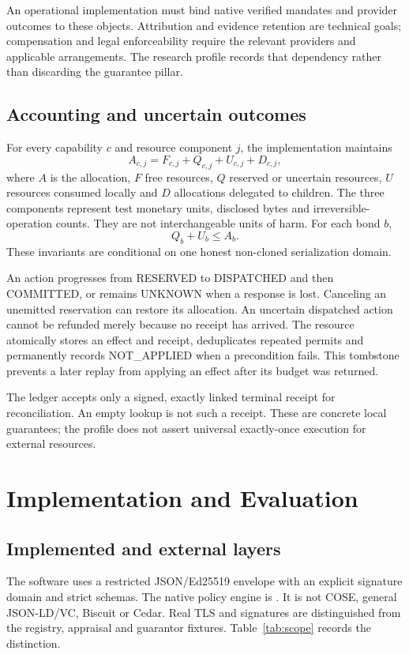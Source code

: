 \documentclass[journal,10pt]{IEEEtran}
\newcommand{\code}[1]{\texttt{\detokenize{#1}}}
\begin{document}
An operational implementation must bind native verified mandates and provider outcomes to these objects. Attribution and evidence retention are technical goals; compensation and legal enforceability require the relevant providers and applicable arrangements. The research profile records that dependency rather than discarding the guarantee pillar.

\subsection{Accounting and uncertain outcomes}
For every capability $c$ and resource component $j$, the implementation maintains
\begin{equation}
 A_{c,j}=F_{c,j}+Q_{c,j}+U_{c,j}+D_{c,j},
\end{equation}
where $A$ is the allocation, $F$ free resources, $Q$ reserved or uncertain resources, $U$ resources consumed locally and $D$ allocations delegated to children. The three components represent test monetary units, disclosed bytes and irreversible-operation counts. They are not interchangeable units of harm. For each bond $b$,
\begin{equation}
 Q_b+U_b\leq A_b.
\end{equation}
These invariants are conditional on one honest non-cloned serialization domain.

An action progresses from RESERVED to DISPATCHED and then COMMITTED, or remains UNKNOWN when a response is lost. Canceling an unemitted reservation can restore its allocation. An uncertain dispatched action cannot be refunded merely because no receipt has arrived. The resource atomically stores an effect and receipt, deduplicates repeated permits and permanently records NOT\_APPLIED when a precondition fails. This tombstone prevents a later replay from applying an effect after its budget was returned.

The ledger accepts only a signed, exactly linked terminal receipt for reconciliation. An empty lookup is not such a receipt. These are concrete local guarantees; the profile does not assert universal exactly-once execution for external resources.

\section{Implementation and Evaluation}
\subsection{Implemented and external layers}
The software uses a restricted JSON/Ed25519 envelope with an explicit signature domain and strict schemas. The native policy engine is \code{aigp-static-v1}. It is not COSE, general JSON-LD/VC, Biscuit or Cedar. Real TLS and signatures are distinguished from the registry, appraisal and guarantor fixtures. Table~\ref{tab:scope} records the distinction.
\end{document}
